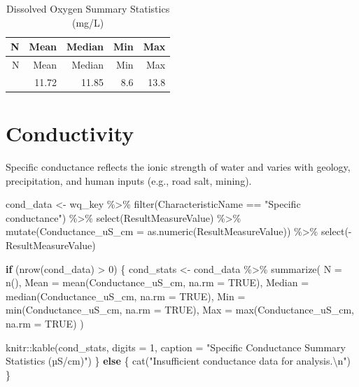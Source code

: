 \documentclass[
  letterpaper,
]{scrbook}
\newenvironment{Shaded}{\begin{snugshade}}{\end{snugshade}}
\newcommand{\AttributeTok}[1]{\textcolor[rgb]{0.40,0.45,0.13}{#1}}
\newcommand{\ConstantTok}[1]{\textcolor[rgb]{0.56,0.35,0.01}{#1}}
\newcommand{\ControlFlowTok}[1]{\textcolor[rgb]{0.00,0.23,0.31}{\textbf{#1}}}
\newcommand{\DecValTok}[1]{\textcolor[rgb]{0.68,0.00,0.00}{#1}}
\newcommand{\FunctionTok}[1]{\textcolor[rgb]{0.28,0.35,0.67}{#1}}
\newcommand{\NormalTok}[1]{\textcolor[rgb]{0.00,0.23,0.31}{#1}}
\newcommand{\OtherTok}[1]{\textcolor[rgb]{0.00,0.23,0.31}{#1}}
\newcommand{\SpecialCharTok}[1]{\textcolor[rgb]{0.37,0.37,0.37}{#1}}
\newcommand{\StringTok}[1]{\textcolor[rgb]{0.13,0.47,0.30}{#1}}
\begin{document}
\begin{longtable}[]{@{}rrrrr@{}}
\caption{Dissolved Oxygen Summary Statistics (mg/L)}\tabularnewline
\toprule\noalign{}
N & Mean & Median & Min & Max \\
\midrule\noalign{}
\endfirsthead
\toprule\noalign{}
N & Mean & Median & Min & Max \\
\midrule\noalign{}
\endhead
\bottomrule\noalign{}
\endlastfoot
106 & 11.72 & 11.85 & 8.6 & 13.8 \\
\end{longtable}

\section{Conductivity}\label{conductivity}

Specific conductance reflects the ionic strength of water and varies
with geology, precipitation, and human inputs (e.g., road salt, mining).

\begin{Shaded}
\begin{Highlighting}[]
\NormalTok{cond\_data }\OtherTok{\textless{}{-}}\NormalTok{ wq\_key }\SpecialCharTok{\%\textgreater{}\%}
  \FunctionTok{filter}\NormalTok{(CharacteristicName }\SpecialCharTok{==} \StringTok{"Specific conductance"}\NormalTok{) }\SpecialCharTok{\%\textgreater{}\%}
  \FunctionTok{select}\NormalTok{(ResultMeasureValue) }\SpecialCharTok{\%\textgreater{}\%}
  \FunctionTok{mutate}\NormalTok{(}\AttributeTok{Conductance\_uS\_cm =} \FunctionTok{as.numeric}\NormalTok{(ResultMeasureValue)) }\SpecialCharTok{\%\textgreater{}\%}
  \FunctionTok{select}\NormalTok{(}\SpecialCharTok{{-}}\NormalTok{ResultMeasureValue)}

\ControlFlowTok{if}\NormalTok{ (}\FunctionTok{nrow}\NormalTok{(cond\_data) }\SpecialCharTok{\textgreater{}} \DecValTok{0}\NormalTok{) \{}
\NormalTok{  cond\_stats }\OtherTok{\textless{}{-}}\NormalTok{ cond\_data }\SpecialCharTok{\%\textgreater{}\%}
    \FunctionTok{summarize}\NormalTok{(}
      \AttributeTok{N =} \FunctionTok{n}\NormalTok{(),}
      \AttributeTok{Mean =} \FunctionTok{mean}\NormalTok{(Conductance\_uS\_cm, }\AttributeTok{na.rm =} \ConstantTok{TRUE}\NormalTok{),}
      \AttributeTok{Median =} \FunctionTok{median}\NormalTok{(Conductance\_uS\_cm, }\AttributeTok{na.rm =} \ConstantTok{TRUE}\NormalTok{),}
      \AttributeTok{Min =} \FunctionTok{min}\NormalTok{(Conductance\_uS\_cm, }\AttributeTok{na.rm =} \ConstantTok{TRUE}\NormalTok{),}
      \AttributeTok{Max =} \FunctionTok{max}\NormalTok{(Conductance\_uS\_cm, }\AttributeTok{na.rm =} \ConstantTok{TRUE}\NormalTok{)}
\NormalTok{    )}
  
\NormalTok{  knitr}\SpecialCharTok{::}\FunctionTok{kable}\NormalTok{(cond\_stats, }\AttributeTok{digits =} \DecValTok{1}\NormalTok{, }\AttributeTok{caption =} \StringTok{"Specific Conductance Summary Statistics (µS/cm)"}\NormalTok{)}
\NormalTok{\} }\ControlFlowTok{else}\NormalTok{ \{}
  \FunctionTok{cat}\NormalTok{(}\StringTok{"Insufficient conductance data for analysis.}\SpecialCharTok{\textbackslash{}n}\StringTok{"}\NormalTok{)}
\NormalTok{\}}
\end{Highlighting}
\end{Shaded}
\end{document}
